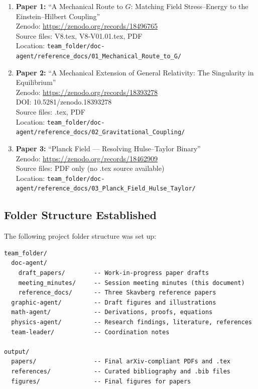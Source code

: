 \documentclass[11pt,a4paper]{article}
\begin{document}
\begin{enumerate}
    \item \textbf{Paper 1:} ``A Mechanical Route to $G$: Matching Field Stress--Energy to the Einstein--Hilbert Coupling'' \\
    Zenodo: \url{https://zenodo.org/records/18496765} \\
    Source files: V8.tex, V8-V01.01.tex, PDF \\
    Location: \texttt{team\_folder/doc-agent/reference\_docs/01\_Mechanical\_Route\_to\_G/}

    \item \textbf{Paper 2:} ``A Mechanical Extension of General Relativity: The Singularity in Equilibrium'' \\
    Zenodo: \url{https://zenodo.org/records/18393278} \\
    DOI: 10.5281/zenodo.18393278 \\
    Source files: .tex, PDF \\
    Location: \texttt{team\_folder/doc-agent/reference\_docs/02\_Gravitational\_Coupling/}

    \item \textbf{Paper 3:} ``Planck Field --- Resolving Hulse--Taylor Binary'' \\
    Zenodo: \url{https://zenodo.org/records/18462909} \\
    Source files: PDF only (no .tex source available) \\
    Location: \texttt{team\_folder/doc-agent/reference\_docs/03\_Planck\_Field\_Hulse\_Taylor/}
\end{enumerate}

\subsection{Folder Structure Established}
The following project folder structure was set up:

\begin{verbatim}
team_folder/
  doc-agent/
    draft_papers/        -- Work-in-progress paper drafts
    meeting_minutes/     -- Session meeting minutes (this document)
    reference_docs/      -- Three Skavberg reference papers
  graphic-agent/         -- Draft figures and illustrations
  math-agent/            -- Derivations, proofs, equations
  physics-agent/         -- Research findings, literature, references
  team-leader/           -- Coordination notes

output/
  papers/                -- Final arXiv-compliant PDFs and .tex
  references/            -- Curated bibliography and .bib files
  figures/               -- Final figures for papers
\end{verbatim}
\end{document}
